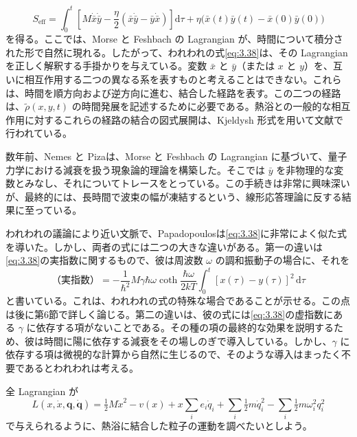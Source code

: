 \begin{equation}
S_{\mathrm{eff}}=\int_0^t\left[M\dot{\bar x}\dot{\bar y}
-\frac{\eta}{2}(\bar x\dot{\bar y}-\bar y\dot{\bar x})\right]\mathrm d\tau
+\eta\bigl(\bar x(t)\bar y(t)-\bar x(0)\bar y(0)\bigr)
\tag{3.41}\label{eq:3.41}
\end{equation}
を得る。ここでは、Morse と Feshbach の Lagrangian が、時間について積分された形で自然に現れる。したがって、われわれの式\eqref{eq:3.38}は、その Lagrangian を正しく解釈する手掛かりを与えている。変数 $\bar x$ と $\bar y$（または $x$ と $y$）を、互いに相互作用する二つの異なる系を表すものと考えることはできない。これらは、時間を順方向および逆方向に進む、結合した経路を表す。この二つの経路は、$\widetilde\rho(x,y,t)$ の時間発展を記述するために必要である。熱浴との一般的な相互作用に対するこれらの経路の結合の図式展開は、Kjeldysh 形式\cite{ref26}を用いて文献\cite{ref17}で行われている。

数年前、Nemes と Piza\cite{ref27}は、Morse と Feshbach の Lagrangian に基づいて、量子力学における減衰を扱う現象論的理論を構築した。そこでは $\bar y$ を非物理的な変数とみなし、それについてトレースをとっている。この手続きは非常に興味深いが、最終的には、長時間で波束の幅が凍結するという、線形応答理論に反する結果に至っている。

われわれの議論により近い文脈で、Papadopoulos\cite{ref28}は\eqref{eq:3.38}に非常によく似た式を導いた。しかし、両者の式には二つの大きな違いがある。第一の違いは\eqref{eq:3.38}の実指数に関するもので、彼は周波数 $\omega$ の調和振動子の場合に、それを
\begin{equation}
\text{（実指数）}=-\frac{1}{\hbar^2}M\gamma\hbar\omega
\coth\frac{\hbar\omega}{2kT}\int_0^t[x(\tau)-y(\tau)]^2\,\mathrm d\tau
\tag{3.42}\label{eq:3.42}
\end{equation}
と書いている。これは、われわれの式の特殊な場合であることが示せる。この点は後に第6節で詳しく論じる。第二の違いは、彼の式には\eqref{eq:3.38}の虚指数にある $\gamma$ に依存する項がないことである。その種の項の最終的な効果を説明するため、彼は時間に陽に依存する減衰をその場しのぎで導入している。しかし、$\gamma$ に依存する項は微視的な計算から自然に生じるので、そのような導入はまったく不要であるとわれわれは考える。

\label{sec:4}
全 Lagrangian が
\begin{equation}
L(x,\dot x,\boldsymbol q,\dot{\boldsymbol q})
=\tfrac12 M\dot x^2-v(x)+x\sum_i e_i\dot q_i
+\sum_i\tfrac12 m\dot q_i^2-\sum_i\tfrac12 m\omega_i^2q_i^2
\tag{4.1}\label{eq:4.1}
\end{equation}
で与えられるように、熱浴に結合した粒子の運動を調べたいとしよう。

